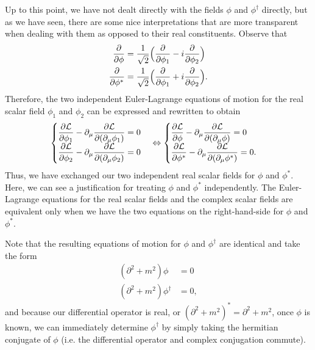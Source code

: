 {Up to this point, we have not dealt directly with the fields $\phi$ and $\phi^{\dagger}$ directly, but as we have seen, there are some nice interpretations that are more transparent when dealing with them as opposed to their real constituents.
Observe that
\begin{align}
    \pdv{\phi} &= \frac{1}{\sqrt{2}} \Big( \pdv{\phi_1} - i \pdv{\phi_2} \Big) \\
    \pdv{\phi^{*}} &= \frac{1}{\sqrt{2}} \Big( \pdv{\phi_1} + i \pdv{\phi_2} \Big)
.\end{align}
Therefore, the two independent Euler-Lagrange equations of motion for the real scalar field $\phi_1$ and $\phi_2$ can be expressed and rewritten to obtain
\begin{align}
\begin{cases}
    \displaystyle \pdv{\mathcal{L}}{\phi_{1}} - \partial_{\mu} \pdv{\mathcal{L}}{(\partial_{\mu} \phi_1)} = 0 \\
    \displaystyle \pdv{\mathcal{L}}{\phi_{2}} - \partial_{\mu} \pdv{\mathcal{L}}{(\partial_{\mu} \phi_2)} = 0
\end{cases}
\Leftrightarrow
\begin{cases}
    \displaystyle \pdv{\mathcal{L}}{\phi} - \partial_{\mu} \pdv{\mathcal{L}}{(\partial_{\mu} \phi)} = 0 \\
    \displaystyle \pdv{\mathcal{L}}{\phi^{*}} - \partial_{\mu} \pdv{\mathcal{L}}{(\partial_{\mu} \phi^{*})} = 0
.\end{cases}
\end{align}
Thus, we have exchanged our two independent real scalar fields for $\phi$ and $\phi^{*}$.
Here, we can see a justification for treating $\phi$ and $\phi^{*}$ independently. 
The Euler-Lagrange equations for the real scalar fields and the complex scalar fields are equivalent only when we have the two equations on the right-hand-side for $\phi$ and $\phi^{*}$.

Note that the resulting equations of motion for $\phi$ and $\phi^{\dagger}$ are identical and take the form
\begin{align}
    (\partial^2 + m^2) \phi &= 0 \\
    (\partial^2 + m^2) \phi^{\dagger} &= 0
,\end{align}
and because our differential operator is real, or $(\partial^2 + m^2)^{*} = \partial^2 + m^2$, once $\phi$ is known, we can immediately determine $\phi^{\dagger}$ by simply taking the hermitian conjugate of $\phi$ (i.e. the differential operator and complex conjugation commute).

}


